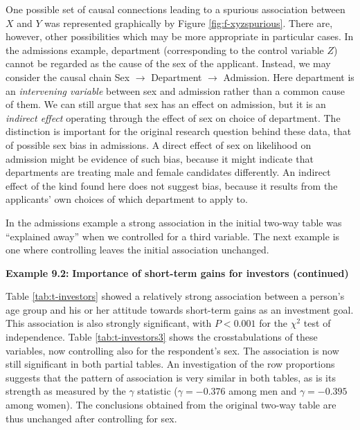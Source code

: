 \documentclass[11pt,a4paper,openany]{book}
\begin{document}
One possible set of causal connections leading to a spurious association
between \(X\) and \(Y\) was represented graphically by Figure
\ref{fig:f-xyzspurious}. There are, however, other possibilities which
may be more appropriate in particular cases. In the admissions example,
department (corresponding to the control variable \(Z\)) cannot be
regarded as the cause of the sex of the applicant. Instead, we may
consider the causal chain Sex \(\longrightarrow\) Department
\(\longrightarrow\) Admission. Here department is an \emph{intervening
variable} between sex and admission rather than a common cause of them.
We can still argue that sex has an effect on admission, but it is an
\emph{indirect effect} operating through the effect of sex on choice of
department. The distinction is important for the original research
question behind these data, that of possible sex bias in admissions. A
direct effect of sex on likelihood on admission might be evidence of
such bias, because it might indicate that departments are treating male
and female candidates differently. An indirect effect of the kind found
here does not suggest bias, because it results from the applicants' own
choices of which department to apply to.

In the admissions example a strong association in the initial two-way
table was ``explained away'' when we controlled for a third variable.
The next example is one where controlling leaves the initial association
unchanged.

\textbf{Example 9.2:} \textbf{Importance of short-term gains for
investors (continued)}

Table \ref{tab:t-investors} showed a relatively strong association
between a person's age group and his or her attitude towards short-term
gains as an investment goal. This association is also strongly
significant, with \(P<0.001\) for the \(\chi^{2}\) test of independence.
Table \ref{tab:t-investors3} shows the crosstabulations of these
variables, now controlling also for the respondent's sex. The
association is now still significant in both partial tables. An
investigation of the row proportions suggests that the pattern of
association is very similar in both tables, as is its strength as
measured by the \(\gamma\) statistic (\(\gamma=-0.376\) among men and
\(\gamma=-0.395\) among women). The conclusions obtained from the
original two-way table are thus unchanged after controlling for sex.
\end{document}
